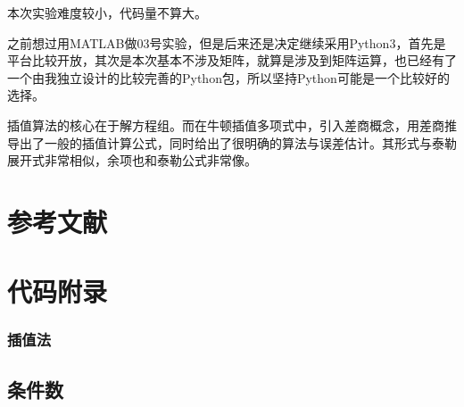 本次实验难度较小，代码量不算大。

之前想过用MATLAB做03号实验，但是后来还是决定继续采用Python3，首先是平台比较开放，其次是本次基本不涉及矩阵，就算是涉及到矩阵运算，也已经有了一个由我独立设计的比较完善的Python包，所以坚持Python可能是一个比较好的选择。

插值算法的核心在于解方程组。而在牛顿插值多项式中，引入差商概念，用差商推导出了一般的插值计算公式，同时给出了很明确的算法与误差估计。其形式与泰勒展开式非常相似，余项也和泰勒公式非常像。

\section{参考文献}

\printbibliography[heading=none]


\section{代码附录}
\label{附录}

\subsubsection{插值法}


\subsection{条件数}



